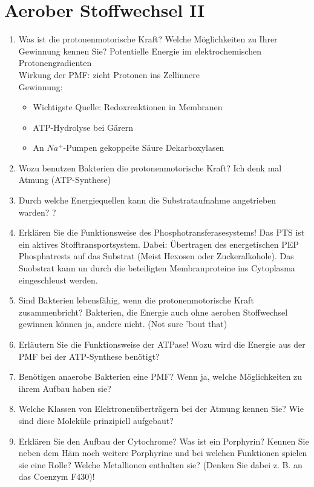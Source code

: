 
\section{Aerober Stoffwechsel II}
\begin{enumerate}
	\item Was ist die protonenmotorische Kraft? Welche Möglichkeiten zu Ihrer Gewinnung kennen Sie?
		Potentielle Energie im elektrochemischen Protonengradienten \\
		Wirkung der PMF: zieht Protonen ins Zellinnere \\
		Gewinnung:  \\
		\begin{itemize}
			\item Wichtigste Quelle: Redoxreaktionen in Membranen
			\item ATP-Hydrolyse bei G\"arern
			\item An $Na^+$-Pumpen gekoppelte S\"aure Dekarboxylasen	
		\end{itemize}

	\item Wozu benutzen Bakterien die protonenmotorische Kraft?
		Ich denk mal Atmung (ATP-Synthese) 
	\item Durch welche Energiequellen kann die Substrataufnahme angetrieben warden?
		?	
	\item Erklären Sie die Funktionsweise des Phosphotransferasesystems! Das PTS ist ein aktives Stofftransportsystem. Dabei: \"Ubertragen des energetischen PEP Phosphatrests auf das Substrat (Meist Hexosen oder Zuckeralkohole). Das Suobstrat kann un durch die beteiligten Membranproteine ins Cytoplasma eingeschleust werden.

	\item Sind Bakterien lebensfähig, wenn die protonenmotorische Kraft zusammenbricht? Bakterien, die Energie auch ohne aeroben Stoffwechsel gewinnen k\"onnen ja, andere nicht. (Not sure 'bout that)
		
	\item Erläutern Sie die Funktionsweise der  ATPase! Wozu wird die Energie aus der PMF bei der ATP-Synthese benötigt?
	\item Benötigen anaerobe Bakterien eine PMF? Wenn ja, welche Möglichkeiten zu ihrem Aufbau haben sie?
	\item Welche Klassen von Elektronenüberträgern bei der Atmung kennen Sie? Wie sind diese Moleküle prinzipiell aufgebaut?
	\item Erklären Sie  den Aufbau der Cytochrome? Was ist ein Porphyrin? Kennen Sie neben dem Häm noch weitere Porphyrine und bei  welchen Funktionen spielen sie eine Rolle? Welche Metallionen enthalten sie? (Denken Sie dabei z. B. an das  Coenzym F430)!
		


\end{enumerate}

